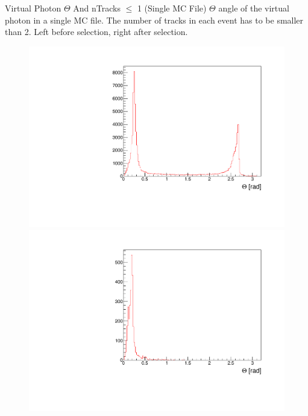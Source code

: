 \documentclass[10pt]{beamer}
\begin{document}
\begin{frame}{Virtual Photon $\Theta$ And nTracks $\leq$ 1 (Single MC File)}
	$\Theta$ angle of the virtual photon in a single MC file. The number of tracks in each event has to be smaller than 2. Left before selection, right after selection.
	
	\begin{figure}
		\centering
		\begin{minipage}{.5\textwidth}
			\centering
			\includegraphics[width=\textwidth]{gg/Thetagg_BS_nT1}
			
		\end{minipage}%
		\begin{minipage}{.5\textwidth}
			\centering
			\includegraphics[width=\textwidth]{gg/Thetagg_AS_nT1}
			
		\end{minipage}
	\end{figure}
	
	
	
\end{frame}
\end{document}
